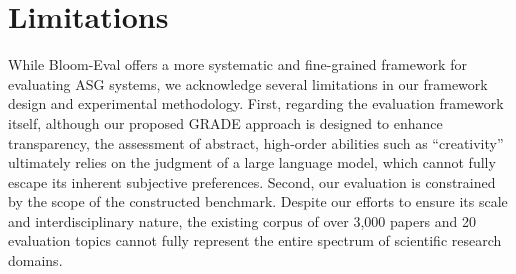 \documentclass[11pt]{article}
\begin{document}
\section*{Limitations}
While Bloom-Eval offers a more systematic and fine-grained framework for evaluating ASG systems, we acknowledge several limitations in our framework design and experimental methodology. First, regarding the evaluation framework itself, although our proposed GRADE approach is designed to enhance transparency, the assessment of abstract, high-order abilities such as ``creativity'' ultimately relies on the judgment of a large language model, which cannot fully escape its inherent subjective preferences. Second, our evaluation is constrained by the scope of the constructed benchmark. Despite our efforts to ensure its scale and interdisciplinary nature, the existing corpus of over 3,000 papers and 20 evaluation topics cannot fully represent the entire spectrum of scientific research domains.



%

\end{document}
